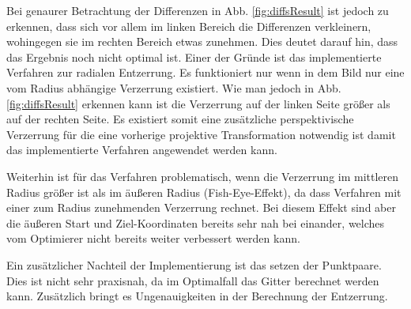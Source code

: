 Bei genaurer Betrachtung der Differenzen in Abb. \ref{fig:diffsResult} ist jedoch zu erkennen, dass sich vor allem im linken Bereich die Differenzen verkleinern, wohingegen sie im rechten Bereich etwas zunehmen.
Dies deutet darauf hin, dass das Ergebnis noch nicht optimal ist. Einer der Gründe ist
das implementierte Verfahren zur radialen Entzerrung. Es funktioniert nur wenn in dem Bild nur eine vom Radius abhängige Verzerrung existiert. Wie man jedoch in Abb. \ref{fig:diffsResult} erkennen kann ist die Verzerrung auf der linken Seite größer als auf der rechten Seite.
Es existiert somit eine zusätzliche perspektivische Verzerrung für die eine vorherige projektive Transformation notwendig ist damit das implementierte Verfahren angewendet werden kann.

Weiterhin ist für das Verfahren problematisch, wenn die Verzerrung im mittleren Radius größer ist als im äußeren Radius (Fish-Eye-Effekt), da dass Verfahren mit einer zum Radius zunehmenden Verzerrung rechnet. Bei diesem Effekt sind aber die äußeren Start und Ziel-Koordinaten bereits sehr nah bei einander, welches vom Optimierer nicht bereits weiter verbessert werden kann.

Ein zusätzlicher Nachteil der Implementierung ist das setzen der Punktpaare. Dies ist nicht sehr praxisnah, da im Optimalfall das Gitter berechnet werden kann. Zusätzlich bringt es Ungenauigkeiten in der Berechnung der Entzerrung.

